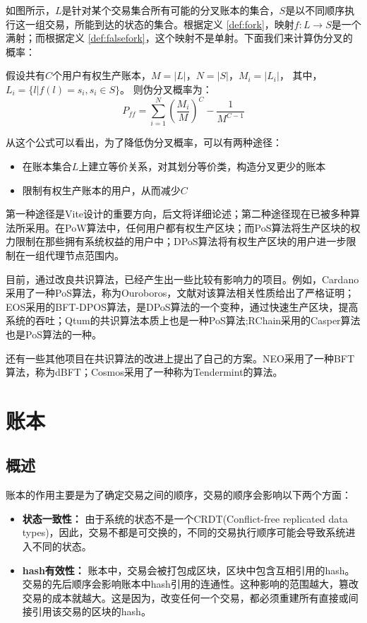 \documentclass[UTF8,nofonts]{ctexart}
\begin{document}
\begin{multicols}{2}
如图所示，$L$是针对某个交易集合所有可能的分叉账本的集合，$S$是以不同顺序执行这一组交易，所能到达的状态的集合。根据定义 \ref{def:fork}，映射$f: L \rightarrow S$是一个满射；而根据定义 \ref{def:falsefork}，这个映射不是单射。下面我们来计算伪分叉的概率：

假设共有$C$个用户有权生产账本，$M = \vert L \vert$，$N = \vert S \vert$，$M_{i} = \vert L_{i} \vert$， 其中，$L_{i} = \lbrace l \vert f(l) = s_{i}, s_{i} \in S \rbrace$。
则伪分叉概率为：
\begin{equation}
P_{ff} = \sum_{i=1}^{N}\left ( \frac{M_{i}}{M} \right )^{C} - \frac{1}{M^{C-1}}
\end{equation}

从这个公式可以看出，为了降低伪分叉概率，可以有两种途径：
\begin{itemize}
	\item 在账本集合$L$上建立等价关系，对其划分等价类，构造分叉更少的账本
	\item 限制有权生产账本的用户，从而减少$C$
\end{itemize}

第一种途径是Vite设计的重要方向，后文将详细论述；第二种途径现在已被多种算法所采用。在PoW算法中，任何用户都有权生产区块；而PoS算法将生产区块的权力限制在那些拥有系统权益的用户中；DPoS算法\cite{dpos}将有权生产区块的用户进一步限制在一组代理节点范围内。
	
目前，通过改良共识算法，已经产生出一些比较有影响力的项目。例如，Cardano采用了一种PoS算法，称为Ouroboros，文献\cite{bernardo2017ouroboros}对该算法相关性质给出了严格证明；EOS\cite{eos}采用的BFT-DPOS算法，是DPoS算法的一个变种，通过快速生产区块，提高系统的吞吐；Qtum\cite{dai2017smart}的共识算法本质上也是一种PoS算法;RChain\cite{rchain}采用的Casper算法也是PoS算法的一种。

还有一些其他项目在共识算法的改进上提出了自己的方案。NEO\cite{neo}采用了一种BFT算法，称为dBFT；Cosmos\cite{cosmos}采用了一种称为Tendermint\cite{tendermint}的算法。

\section{账本}
\subsection{概述}
账本的作用主要是为了确定交易之间的顺序，交易的顺序会影响以下两个方面：
\begin{itemize}
	\item \textbf{状态一致性：} 由于系统的状态不是一个CRDT(Conflict-free replicated data types)\cite{crdt}，因此，交易不都是可交换的，不同的交易执行顺序可能会导致系统进入不同的状态。
	\item \textbf{hash有效性：} 账本中，交易会被打包成区块，区块中包含互相引用的hash。交易的先后顺序会影响账本中hash引用的连通性。这种影响的范围越大，篡改交易的成本就越大。这是因为，改变任何一个交易，都必须重建所有直接或间接引用该交易的区块的hash。
\end{itemize}


\end{multicols}
\end{document}
